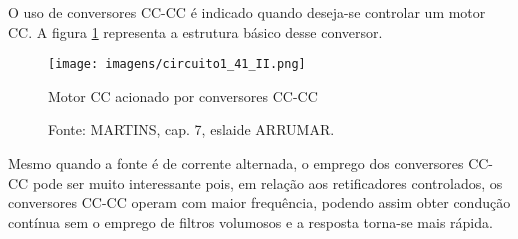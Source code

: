 O uso de conversores CC-CC é indicado quando deseja-se controlar um motor CC. A figura \ref{fig:C1-41-II} representa a estrutura básico desse conversor.

\begin{figure}[ht!]
\center
\texttt{[image: imagens/circuito1\_41\_II.png]}
\caption{\label{fig:C1-41-II} Motor CC acionado por conversores CC-CC}
\caption*{Fonte: MARTINS, cap. 7, eslaide ARRUMAR.}
\end{figure}

Mesmo quando a fonte é de corrente alternada, o emprego dos conversores CC-CC pode ser muito interessante pois, em relação aos retificadores controlados, os conversores CC-CC operam com maior frequência, podendo assim obter condução contínua sem o emprego de filtros volumosos e a resposta torna-se mais rápida. 

